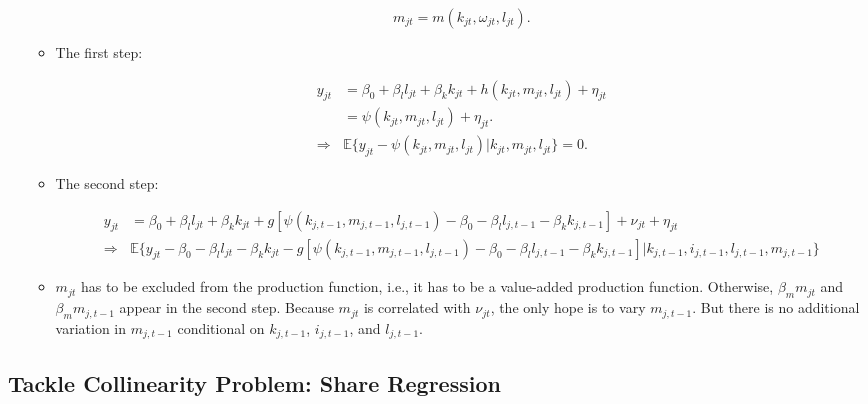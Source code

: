 \documentclass[]{book}
\begin{document}
\begin{enumerate}
\begin{itemize}
    \begin{equation}
    m_{jt} = m(k_{jt}, \omega_{jt}, l_{jt}).
    \end{equation}
  \item
    The first step:

    \begin{equation}
    \begin{split}
    y_{jt} &= \beta_0 + \beta_l l_{jt} + \beta_k k_{jt} + h(k_{jt}, m_{jt}, l_{jt}) + \eta_{jt}\\
    &= \psi(k_{jt}, m_{jt}, l_{jt}) + \eta_{jt}.\\
    \Rightarrow & \mathbb{E}\{y_{jt} - \psi(k_{jt}, m_{jt}, l_{jt})|k_{jt}, m_{jt}, l_{jt}\} = 0.
    \end{split}
    \end{equation}
  \item
    The second step:

    \begin{equation}
    \begin{split}
    y_{jt} &= \beta_0 + \beta_l l_{jt} + \beta_k k_{jt} + g[\psi(k_{j, t - 1}, m_{j, t - 1}, l_{j, t - 1}) - \beta_0 - \beta_l l_{j, t - 1} - \beta_k k_{j, t - 1}] + \nu_{jt} + \eta_{jt}\\
    \Rightarrow & \mathbb{E}\{y_{jt} - \beta_0 - \beta_l l_{jt} - \beta_k k_{jt} - g[\psi(k_{j, t - 1}, m_{j, t - 1}, l_{j, t - 1}) - \beta_0 - \beta_l l_{j, t - 1} - \beta_k k_{j, t - 1}]|k_{j, t - 1}, i_{j, t - 1}, l_{j, t - 1}, m_{j, t - 1}\}
    \end{split}
    \end{equation}
  \item
    \(m_{jt}\) has to be excluded from the production function, i.e., it
    has to be a value-added production function. Otherwise,
    \(\beta_m m_{jt}\) and \(\beta_m m_{j, t - 1}\) appear in the second
    step. Because \(m_{jt}\) is correlated with \(\nu_{jt}\), the only
    hope is to vary \(m_{j, t - 1}\). But there is no additional
    variation in \(m_{j, t - 1}\) conditional on \(k_{j, t - 1}\),
    \(i_{j, t - 1}\), and \(l_{j, t - 1}\).
  \end{itemize}
\end{enumerate}

\subsection{Tackle Collinearity Problem: Share
Regression}\label{tackle-collinearity-problem-share-regression}
\end{document}

